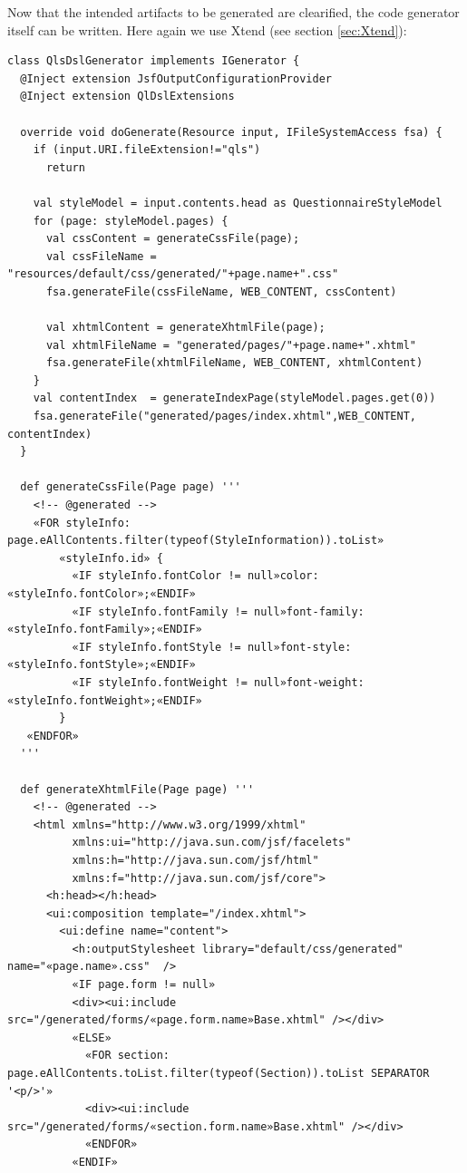 Now that the intended artifacts to be generated are clearified, the code generator
itself can be written. Here again we use Xtend (see section \ref{sec:Xtend}):

\begin{lstlisting}[language=Xtend]
class QlsDslGenerator implements IGenerator {
  @Inject extension JsfOutputConfigurationProvider
  @Inject extension QlDslExtensions
  
  override void doGenerate(Resource input, IFileSystemAccess fsa) {
    if (input.URI.fileExtension!="qls")
      return
            
    val styleModel = input.contents.head as QuestionnaireStyleModel
    for (page: styleModel.pages) {
      val cssContent = generateCssFile(page);
   	  val cssFileName = "resources/default/css/generated/"+page.name+".css"
   	  fsa.generateFile(cssFileName, WEB_CONTENT, cssContent)
   	
   	  val xhtmlContent = generateXhtmlFile(page);
   	  val xhtmlFileName = "generated/pages/"+page.name+".xhtml"
   	  fsa.generateFile(xhtmlFileName, WEB_CONTENT, xhtmlContent)
    }
    val contentIndex  = generateIndexPage(styleModel.pages.get(0))
    fsa.generateFile("generated/pages/index.xhtml",WEB_CONTENT, contentIndex)
  }

  def generateCssFile(Page page) '''
  	<!-- @generated -->
    «FOR styleInfo: page.eAllContents.filter(typeof(StyleInformation)).toList»
		«styleInfo.id» {
		  «IF styleInfo.fontColor != null»color: «styleInfo.fontColor»;«ENDIF»
		  «IF styleInfo.fontFamily != null»font-family: «styleInfo.fontFamily»;«ENDIF»
		  «IF styleInfo.fontStyle != null»font-style: «styleInfo.fontStyle»;«ENDIF»
		  «IF styleInfo.fontWeight != null»font-weight: «styleInfo.fontWeight»;«ENDIF»
		}
   «ENDFOR»
  '''
	
  def generateXhtmlFile(Page page) '''
	<!-- @generated -->
	<html xmlns="http://www.w3.org/1999/xhtml"
	      xmlns:ui="http://java.sun.com/jsf/facelets"
	      xmlns:h="http://java.sun.com/jsf/html"
	      xmlns:f="http://java.sun.com/jsf/core">
	  <h:head></h:head>
	  <ui:composition template="/index.xhtml">
	    <ui:define name="content">
	      <h:outputStylesheet library="default/css/generated" name="«page.name».css"  />
	      «IF page.form != null»
	      <div><ui:include src="/generated/forms/«page.form.name»Base.xhtml" /></div>
	      «ELSE»
	        «FOR section: page.eAllContents.toList.filter(typeof(Section)).toList SEPARATOR '<p/>'»
	        <div><ui:include src="/generated/forms/«section.form.name»Base.xhtml" /></div>
	        «ENDFOR»
	      «ENDIF»
	  

\end{lstlisting}

